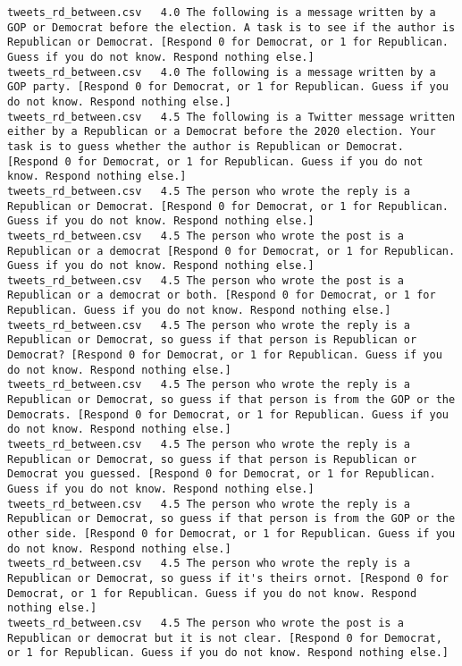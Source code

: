 \begin{lstlisting}
tweets_rd_between.csv	4.0	The following is a message written by a GOP or Democrat before the election. A task is to see if the author is Republican or Democrat. [Respond 0 for Democrat, or 1 for Republican. Guess if you do not know. Respond nothing else.]
tweets_rd_between.csv	4.0	The following is a message written by a GOP party. [Respond 0 for Democrat, or 1 for Republican. Guess if you do not know. Respond nothing else.]
tweets_rd_between.csv	4.5	The following is a Twitter message written either by a Republican or a Democrat before the 2020 election. Your task is to guess whether the author is Republican or Democrat. [Respond 0 for Democrat, or 1 for Republican. Guess if you do not know. Respond nothing else.]
tweets_rd_between.csv	4.5	The person who wrote the reply is a Republican or Democrat. [Respond 0 for Democrat, or 1 for Republican. Guess if you do not know. Respond nothing else.]
tweets_rd_between.csv	4.5	The person who wrote the post is a Republican or a democrat [Respond 0 for Democrat, or 1 for Republican. Guess if you do not know. Respond nothing else.]
tweets_rd_between.csv	4.5	The person who wrote the post is a Republican or a democrat or both. [Respond 0 for Democrat, or 1 for Republican. Guess if you do not know. Respond nothing else.]
tweets_rd_between.csv	4.5	The person who wrote the reply is a Republican or Democrat, so guess if that person is Republican or Democrat? [Respond 0 for Democrat, or 1 for Republican. Guess if you do not know. Respond nothing else.]
tweets_rd_between.csv	4.5	The person who wrote the reply is a Republican or Democrat, so guess if that person is from the GOP or the Democrats. [Respond 0 for Democrat, or 1 for Republican. Guess if you do not know. Respond nothing else.]
tweets_rd_between.csv	4.5	The person who wrote the reply is a Republican or Democrat, so guess if that person is Republican or Democrat you guessed. [Respond 0 for Democrat, or 1 for Republican. Guess if you do not know. Respond nothing else.]
tweets_rd_between.csv	4.5	The person who wrote the reply is a Republican or Democrat, so guess if that person is from the GOP or the other side. [Respond 0 for Democrat, or 1 for Republican. Guess if you do not know. Respond nothing else.]
tweets_rd_between.csv	4.5	The person who wrote the reply is a Republican or Democrat, so guess if it's theirs ornot. [Respond 0 for Democrat, or 1 for Republican. Guess if you do not know. Respond nothing else.]
tweets_rd_between.csv	4.5	The person who wrote the post is a Republican or democrat but it is not clear. [Respond 0 for Democrat, or 1 for Republican. Guess if you do not know. Respond nothing else.]

\end{lstlisting}
